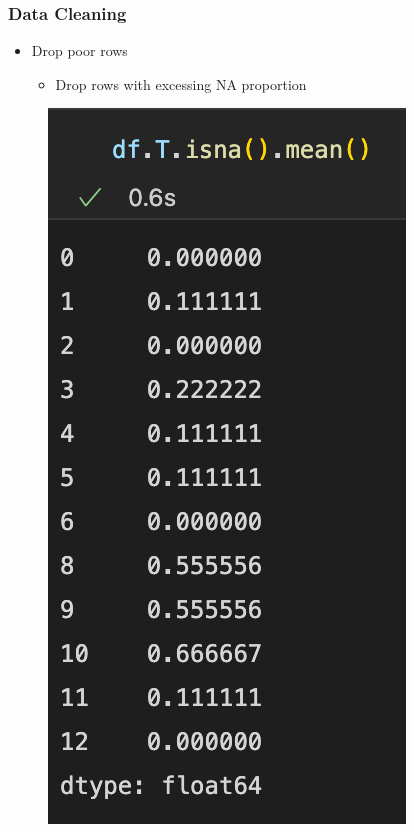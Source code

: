 \begin{frame}\frametitle{Data Cleaning}
   \begin{itemize}
      \item Drop poor rows
      \begin{itemize}
         \item Drop rows with excessing NA proportion
      \end{itemize}
   \end{itemize}
   \vspace{.5cm}
   \begin{minipage}{0.38\linewidth}
      \begin{figure}[H]
         \includegraphics[scale=.35]{../images/illustrations/data_cleaning_detect_rows_na_proportion.png}
      \end{figure}
   \end{minipage}
   \begin{minipage}{0.58\linewidth}

\end{minipage}
\end{frame}
